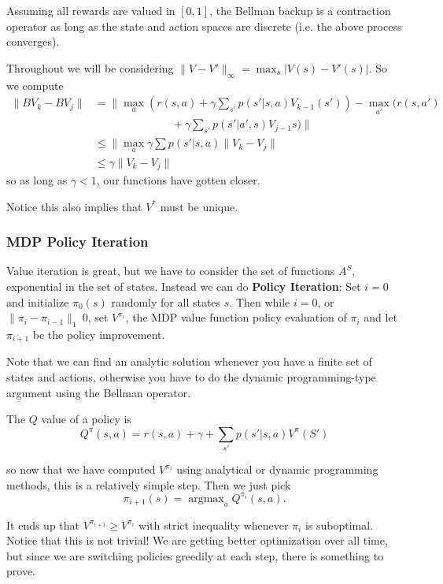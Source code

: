 \documentclass[12pt]{article}
\DeclareMathOperator*{\argmax}{argmax}
\begin{document}
\begin{lem}
	Assuming all rewards are valued in $[0,1]$, the Bellman backup is a contraction operator as long as the state and action spaces are discrete (i.e. the above process converges).
\end{lem}
\begin{prf}
	Throughout we will be considering $\|V-V'\|_\infty=\max_s|V(s)-V'(s)|$. So we compute 
	\begin{align*}
		\|BV_k-BV_j\|&=\|\max_a(r(s,a)+\gamma\sum_{s'}p(s'|s,a)V_{k-1}(s'))-\max_{a'}(r(s,a')\\
		&\qquad\qquad\qquad\quad +\gamma\sum_{s'}p(s'|a',s)V_{j-1}s)\|\\
		&\le\|\max_a \gamma\sum p(s'|s,a)\|V_k-V_j\|\\
		&\le \gamma\|V_k-V_j\|
	\end{align*}
	so as long as $\gamma<1$, our functions have gotten closer.
\end{prf}
\begin{rmk}
	Notice this also implies that $V^\ast$ must be unique.
\end{rmk}

\subsubsection{MDP Policy Iteration}
Value iteration is great, but we have to consider the set of functions $A^S$, exponential in the set of states. Instead we can do \textbf{Policy Iteration}:
Set $i=0$ and initialize $\pi_0(s)$ randomly for all states $s$. Then while $i=0$, or $\|\pi_i-\pi_{i-1}\|_1\>0$, set $V^{\pi_i}$, the MDP
value function policy evaluation of $\pi_i$ and let $\pi_{i+1}$ be the policy improvement.

Note that we can find an analytic solution whenever you have a finite set of states and actions, otherwise you have to do the dynamic programming-type argument using the Bellman operator.
\begin{defn}
	The $Q$ value of a policy is 
	\[Q^\pi(s,a)=r(s,a)+\gamma+\sum_{s'} p(s'|s,a)V^\pi(S')\]
\end{defn}
so now that we have computed $V^{\pi_i}$ using analytical or dynamic programming methods, this is a relatively simple step. Then we just pick
\[\pi_{i+1}(s)=\argmax_aQ^{\pi_i}(s,a).\]

\begin{rmk}
	It ends up that $V^{\pi_{i+1}}\ge V^{\pi_i}$ with strict inequality whenever $\pi_i$ is suboptimal. Notice that this is not trivial! We are getting better optimization over all time, 
	but since we are switching policies greedily at each step, there is something to prove.
\end{rmk}
\end{document}
